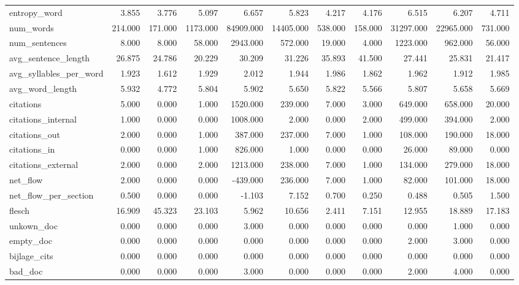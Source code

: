 \begin{tabular}{lrrrrrrrrrr}
\cline{1-11}
entropy\_word & 3.855 & 3.776 & 5.097 & 6.657 & 5.823 & 4.217 & 4.176 & 6.515 & 6.207 & 4.711 \\
\cline{1-11}
num\_words & 214.000 & 171.000 & 1173.000 & 84909.000 & 14405.000 & 538.000 & 158.000 & 31297.000 & 22965.000 & 731.000 \\
\cline{1-11}
num\_sentences & 8.000 & 8.000 & 58.000 & 2943.000 & 572.000 & 19.000 & 4.000 & 1223.000 & 962.000 & 56.000 \\
\cline{1-11}
avg\_sentence\_length & 26.875 & 24.786 & 20.229 & 30.209 & 31.226 & 35.893 & 41.500 & 27.441 & 25.831 & 21.417 \\
\cline{1-11}
avg\_syllables\_per\_word & 1.923 & 1.612 & 1.929 & 2.012 & 1.944 & 1.986 & 1.862 & 1.962 & 1.912 & 1.985 \\
\cline{1-11}
avg\_word\_length & 5.932 & 4.772 & 5.804 & 5.902 & 5.650 & 5.822 & 5.566 & 5.807 & 5.658 & 5.669 \\
\cline{1-11}
citations & 5.000 & 0.000 & 1.000 & 1520.000 & 239.000 & 7.000 & 3.000 & 649.000 & 658.000 & 20.000 \\
\cline{1-11}
citations\_internal & 1.000 & 0.000 & 0.000 & 1008.000 & 2.000 & 0.000 & 2.000 & 499.000 & 394.000 & 2.000 \\
\cline{1-11}
citations\_out & 2.000 & 0.000 & 1.000 & 387.000 & 237.000 & 7.000 & 1.000 & 108.000 & 190.000 & 18.000 \\
\cline{1-11}
citations\_in & 0.000 & 0.000 & 1.000 & 826.000 & 1.000 & 0.000 & 0.000 & 26.000 & 89.000 & 0.000 \\
\cline{1-11}
citations\_external & 2.000 & 0.000 & 2.000 & 1213.000 & 238.000 & 7.000 & 1.000 & 134.000 & 279.000 & 18.000 \\
\cline{1-11}
net\_flow & 2.000 & 0.000 & 0.000 & -439.000 & 236.000 & 7.000 & 1.000 & 82.000 & 101.000 & 18.000 \\
\cline{1-11}
net\_flow\_per\_section & 0.500 & 0.000 & 0.000 & -1.103 & 7.152 & 0.700 & 0.250 & 0.488 & 0.505 & 1.500 \\
\cline{1-11}
flesch & 16.909 & 45.323 & 23.103 & 5.962 & 10.656 & 2.411 & 7.151 & 12.955 & 18.889 & 17.183 \\
\cline{1-11}
unkown\_doc & 0.000 & 0.000 & 0.000 & 3.000 & 0.000 & 0.000 & 0.000 & 0.000 & 1.000 & 0.000 \\
\cline{1-11}
empty\_doc & 0.000 & 0.000 & 0.000 & 0.000 & 0.000 & 0.000 & 0.000 & 2.000 & 3.000 & 0.000 \\
\cline{1-11}
bijlage\_cits & 0.000 & 0.000 & 0.000 & 0.000 & 0.000 & 0.000 & 0.000 & 0.000 & 0.000 & 0.000 \\
\cline{1-11}
bad\_doc & 0.000 & 0.000 & 0.000 & 3.000 & 0.000 & 0.000 & 0.000 & 2.000 & 4.000 & 0.000 \\
\cline{1-11}
\bottomrule
\end{tabular}
